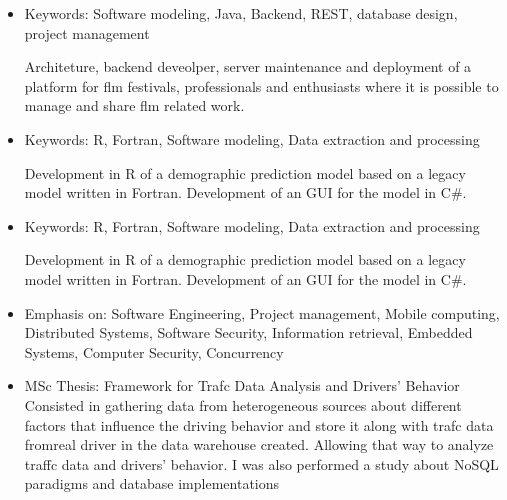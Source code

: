 \documentclass[10pt,a4paper]{altacv}
\begin{document}
\divider

\begin{itemize}
\justifying
\item Keywords: Software modeling, Java, Backend, REST, database design, project management

  Architeture, backend deveolper, server maintenance and deployment of a platform for flm festivals, professionals and enthusiasts where it is possible to manage and share flm related work. 
\end{itemize}

\divider

\begin{itemize}
\justifying
\item Keywords: R, Fortran, Software modeling, Data extraction and processing 

  Development in R of a demographic prediction model based on a legacy model 
written in Fortran. Development of an GUI for the model in C#.
\end{itemize}


\newpage 

\begin{itemize}
\justifying
\item Keywords: R, Fortran, Software modeling, Data extraction and processing 

  Development in R of a demographic prediction model based on a legacy model 
written in Fortran. Development of an GUI for the model in C#.
\end{itemize}

 
\begin{itemize}
\justifying
\item Emphasis on: Software Engineering, Project management, Mobile computing, Distributed Systems, Software Security, Information retrieval, Embedded Systems, Computer Security, Concurrency
\item MSc Thesis: Framework for Trafc Data Analysis and Drivers’ Behavior
Consisted in gathering data from heterogeneous sources about diﬀerent factors
that inﬂuence the driving behavior and store it along with trafc data fromreal
driver in the data warehouse created. Allowing that way to analyze traffc data
and drivers’ behavior. I was also performed a study about NoSQL paradigms and database implementations
\end{itemize}
\divider
\end{document}
